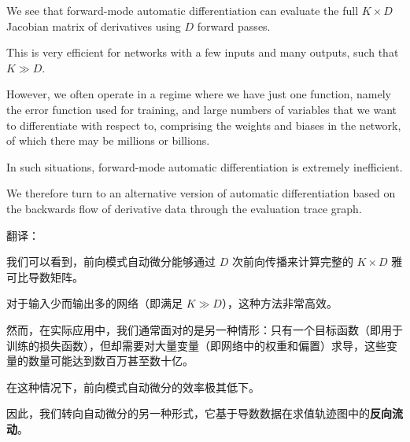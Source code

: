 \documentclass{article}
\begin{document}
We see that forward-mode automatic differentiation can evaluate the full $K \times D$ Jacobian matrix of derivatives using $D$ forward passes. 

This is very efficient for networks with a few inputs and many outputs, such that $K \gg D$. 

However, we often operate in a regime where we have just one function, namely the error function used for training, and large numbers of variables that we want to differentiate with respect to, comprising the weights and biases in the network, of which there may be millions or billions. 

In such situations, forward-mode automatic differentiation is extremely inefficient. 

We therefore turn to an alternative version of automatic differentiation based on the backwards flow of derivative data through the evaluation trace graph.


{\color{red}
翻译：%

我们可以看到，前向模式自动微分能够通过 $D$ 次前向传播来计算完整的 $K \times D$ 雅可比导数矩阵。

对于输入少而输出多的网络（即满足 $K \gg D$），这种方法非常高效。

然而，在实际应用中，我们通常面对的是另一种情形：只有一个目标函数（即用于训练的损失函数），但却需要对大量变量（即网络中的权重和偏置）求导，这些变量的数量可能达到数百万甚至数十亿。

在这种情况下，前向模式自动微分的效率极其低下。

因此，我们转向自动微分的另一种形式，它基于导数数据在求值轨迹图中的\textbf{反向流动}。
}
\end{document}
